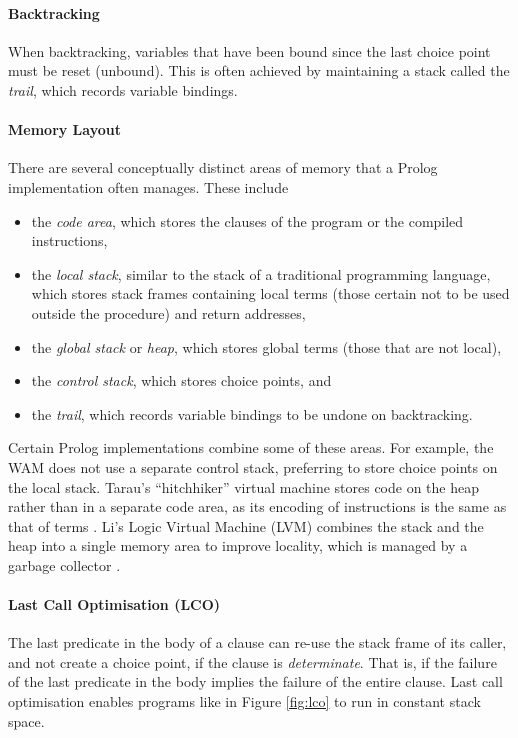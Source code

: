 \paragraph{Backtracking} When backtracking, variables that have been bound since the last choice point must be reset (unbound). This is often achieved by maintaining a stack called the \emph{trail}, which records variable bindings.

\paragraph{Memory Layout} There are several conceptually distinct areas of memory that a Prolog implementation often manages. These include

\begin{itemize}
\item the \emph{code area}, which stores the clauses of the program or the compiled instructions,
\item the \emph{local stack}, similar to the stack of a traditional programming language, which stores stack frames containing local terms (those certain not to be used outside the procedure) and return addresses,
\item the \emph{global stack} or \emph{heap}, which stores global terms (those that are not local),
\item the \emph{control stack}, which stores choice points, and
\item the \emph{trail}, which records variable bindings to be undone on backtracking.
\end{itemize}

Certain Prolog implementations combine some of these areas. For example, the WAM does not use a separate control stack, preferring to store choice points on the local stack. Tarau's ``hitchhiker'' virtual machine stores code on the heap rather than in a separate code area, as its encoding of instructions is the same as that of terms \cite{tarauHitchhikersGuideReinventing2018}. Li's Logic Virtual Machine (LVM) combines the stack and the heap into a single memory area to improve locality, which is managed by a garbage collector \cite{liEfficientMemoryManagement2000}.

\paragraph{Last Call Optimisation (LCO)} The last predicate in the body of a clause can re-use the stack frame of its caller, and not create a choice point, if the clause is \emph{determinate}. That is, if the failure of the last predicate in the body implies the failure of the entire clause. Last call optimisation enables programs like in Figure \ref{fig:lco} to run in constant stack space.


